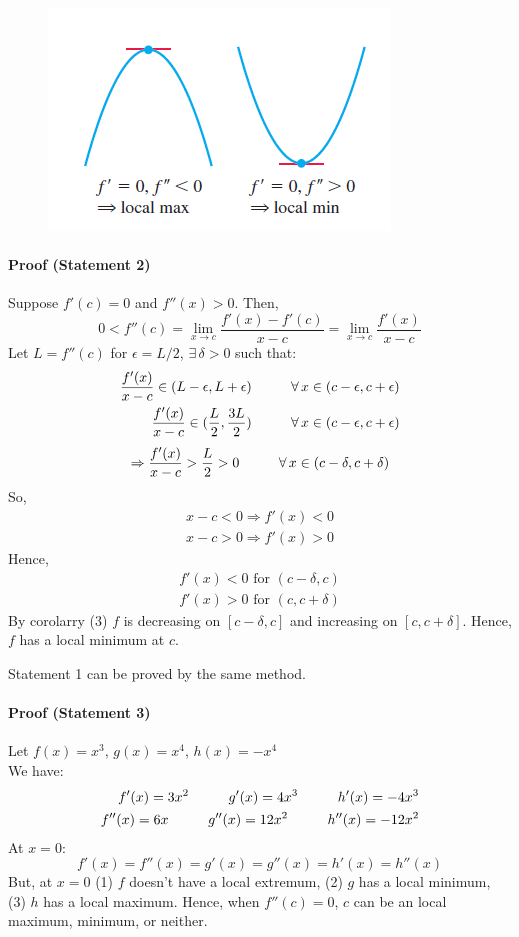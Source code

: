 \documentclass[12pt]{article}
\newcommand\tab[1][1cm]{\hspace*{#1}}
\begin{document}
\begin{figure}[h!]
    \centering
    \includegraphics[width = 0.5\linewidth]{Images/second derivative test.png}
\end{figure}

\paragraph{Proof (Statement 2)}
Suppose $f'(c) = 0$ and $f''(x) > 0$. Then, 
\[
    0 < f''(c) = \lim_{x \to c} \frac{f'(x) - f'(c)}{x - c} = \lim_{x \to c} \frac{f'(x)}{x - c} 
\]
\noindent
Let $L = f''(c)$ for $\epsilon = L/2$, $\exists \, \delta > 0$ such that:
\begin{align*} 
     \frac{f'(x)}{x - c} \in (L - \epsilon, L + \epsilon) \textrm{\tab} \forall \, x \in (c - \epsilon, c + \epsilon) \\
     \frac{f'(x)}{x - c} \in (\frac{L}{2}, \frac{3L}{2}) \textrm{\tab} \forall \, x \in (c - \epsilon, c + \epsilon) 
\end{align*}
\[
    \Rightarrow \frac{f'(x)}{x - c} > \frac{L}{2} > 0 \textrm{\tab} \forall \, x \in (c - \delta, c + \delta) 
\]
So, 
\begin{align*} 
    x - c < 0 \Rightarrow f'(x) < 0 \\
    x - c > 0 \Rightarrow f'(x) > 0
\end{align*}
\noindent
Hence, 
\begin{align*} 
    f'(x) < 0 \textrm{ for } (c - \delta, c) \\
    f'(x) > 0 \textrm{ for } (c, c + \delta)
\end{align*}
By corolarry (3) $f$ is decreasing on $[c - \delta, c]$ and increasing on $[c, c + \delta]$. Hence, $f$ 
has a local minimum at $c$.

Statement 1 can be proved by the same method.

\paragraph{Proof (Statement 3)}
Let $f(x) = x^3$, $g(x) = x^4$, $h(x) = -x^4$\\
We have:
\begin{align*} 
     f'(x) = 3x^2 \textrm{\tab} g'(x) = 4x^3 \textrm{\tab} h'(x) = -4x^3 \\
     f''(x) = 6x \textrm{\tab} g''(x) = 12x^2 \textrm{\tab} h''(x) = - 12x^2 \\
\end{align*}
At $x = 0$:
\[
    f'(x) = f''(x) = g'(x) = g''(x) = h'(x) = h''(x)
\]
But, at $x = 0$ (1) $f$ doesn't have a local extremum, (2) $g$ has a local minimum, (3) $h$ has a local maximum.
Hence, when $f''(c) = 0$, $c$ can be an local maximum, minimum, or neither. 
\end{document}

